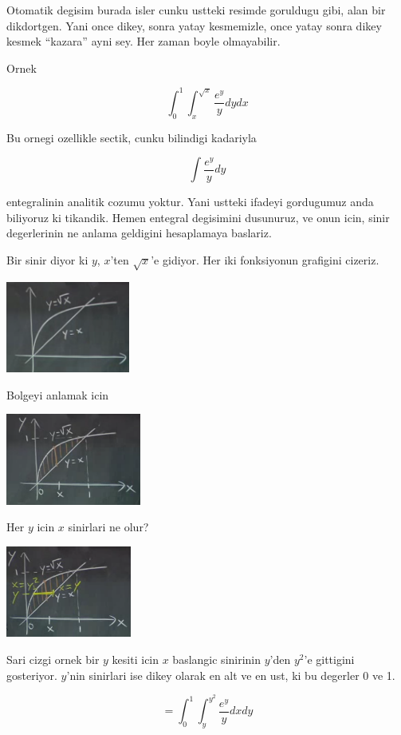 \documentclass[12pt,fleqn]{article}\usepackage{../common}
\begin{document}
Otomatik degisim burada isler cunku ustteki resimde goruldugu gibi, alan
bir dikdortgen. Yani once dikey, sonra yatay kesmemizle, once yatay sonra
dikey kesmek ``kazara'' ayni sey. Her zaman boyle olmayabilir. 

Ornek 

\[ \int_0^1 \int_x^{\sqrt{x}} \frac{e^y}{y} dy dx \]

Bu ornegi ozellikle sectik, cunku bilindigi kadariyla 

\[ \int \frac{e^y}{y} dy \]

entegralinin analitik cozumu yoktur. Yani ustteki ifadeyi gordugumuz anda
biliyoruz ki tikandik. Hemen entegral degisimini dusunuruz, ve onun icin,
sinir degerlerinin ne anlama geldigini hesaplamaya baslariz. 

Bir sinir diyor ki $y$, $x$'ten $\sqrt{x}$'e gidiyor. Her iki fonksiyonun
grafigini cizeriz. 

\includegraphics[height=3cm]{16_13.png}

Bolgeyi anlamak icin

\includegraphics[height=3cm]{16_14.png}

Her $y$ icin $x$ sinirlari ne olur? 

\includegraphics[height=3cm]{16_15.png}

Sari cizgi ornek bir $y$ kesiti icin $x$ baslangic sinirinin $y$'den
$y^2$'e gittigini gosteriyor. $y$'nin sinirlari ise dikey olarak en alt ve
en ust, ki bu degerler 0 ve 1. 

\[ = \int_0^1 \int_y^{y^2}  \frac{e^y}{y} dx dy \]
\end{document}
